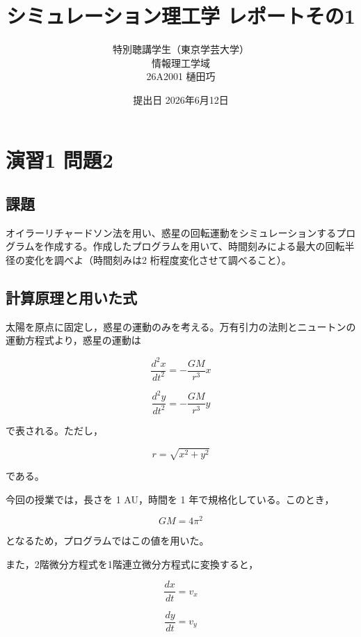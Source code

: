 \documentclass[uplatex,dvipdfmx]{jsarticle}
\title{シミュレーション理工学 レポートその1}
\author{%
特別聴講学生（東京学芸大学）\\
情報理工学域\\
26A2001 樋田巧
}
\date{提出日 2026年6月12日}
\begin{document}
\maketitle

\section{演習1 問題2}

\subsection{課題}
オイラーリチャードソン法を用い、惑星の回転運動をシミュレーションするプログラムを作成する。作成したプログラムを用いて、時間刻みによる最大の回転半径の変化を調べよ（時間刻みは2 桁程度変化させて調べること）。

\subsection{計算原理と用いた式}

太陽を原点に固定し，惑星の運動のみを考える。万有引力の法則とニュートンの運動方程式より，惑星の運動は

\begin{equation}
\frac{d^2x}{dt^2}
=
-\frac{GM}{r^3}x
\end{equation}

\begin{equation}
\frac{d^2y}{dt^2}
=
-\frac{GM}{r^3}y
\end{equation}

で表される。ただし，

\begin{equation}
r=\sqrt{x^2+y^2}
\end{equation}

である。

今回の授業では，長さを 1 AU，時間を 1 年で規格化している。このとき，

\begin{equation}
GM = 4\pi^2
\end{equation}

となるため，プログラムではこの値を用いた。

また，2階微分方程式を1階連立微分方程式に変換すると，

\begin{equation}
\frac{dx}{dt}=v_x
\end{equation}

\begin{equation}
\frac{dy}{dt}=v_y
\end{equation}
\end{document}
